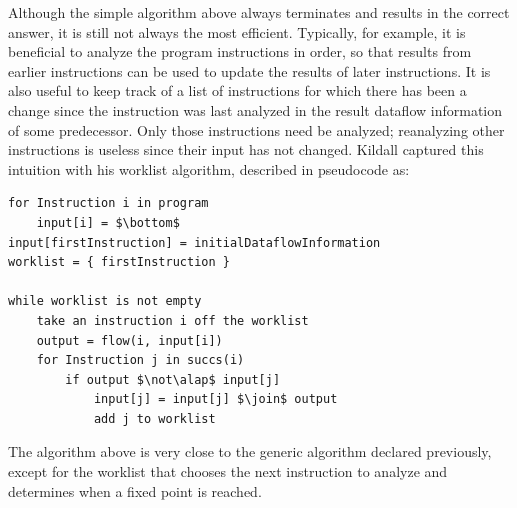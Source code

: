 \documentclass[11pt]{article}
\begin{document}
Although the simple algorithm above always terminates and results in the correct
answer, it is still not always the most efficient.  Typically, for example, it
is beneficial to analyze the program instructions in order, so that results from
earlier instructions can be used to update the results of later instructions.
It is also useful to keep track of a list of instructions for which there has
been a change since the instruction was last analyzed in the result dataflow
information of some predecessor.  Only those instructions need be analyzed;
reanalyzing other instructions is useless since their input has not
changed. Kildall captured this intuition with his worklist algorithm, described
in pseudocode as:

%
%




\begin{lstlisting}[mathescape]
for Instruction i in program
    input[i] = $\bottom$
input[firstInstruction] = initialDataflowInformation
worklist = { firstInstruction }

while worklist is not empty
    take an instruction i off the worklist
    output = flow(i, input[i])
	for Instruction j in succs(i)
		if output $\not\alap$ input[j]
			input[j] = input[j] $\join$ output
			add j to worklist
\end{lstlisting}

\noindent The algorithm above is very close to the generic algorithm declared
previously, except for the worklist that chooses the next instruction to analyze
and determines when a fixed point is reached.
\end{document}
